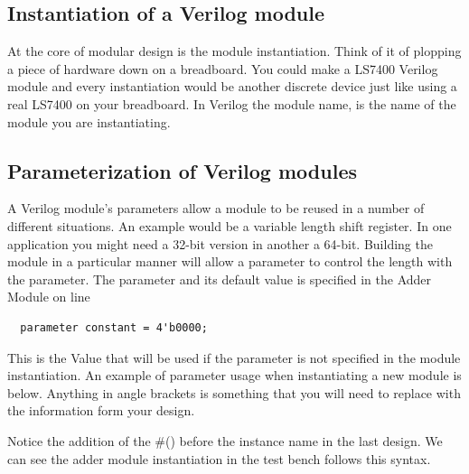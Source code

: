     \subsection{Instantiation of a Verilog module}
      At the core of modular design is the module instantiation. Think of it of plopping a piece of hardware down on a breadboard. You could make a LS7400 Verilog module and every instantiation would be another discrete device just like using a real LS7400 on your breadboard. In Verilog the module name, is the name of the module you are instantiating.
      
    
    \subsection{Parameterization of Verilog modules}
      A Verilog module's parameters allow a module to be reused in a number of different situations. An example would be a variable length shift register. In one application you might need a 32-bit version in another a 64-bit. Building the module in a particular manner will allow a parameter to control the length with the parameter. The parameter and its default value is specified in the Adder Module on line
      \begin{lstlisting}
  parameter constant = 4'b0000;
      \end{lstlisting}
      This is the Value that will be used if the parameter is not specified in the module instantiation. An example of parameter usage when instantiating a new module is below. Anything in angle brackets is something that you will need to replace with the information form your design.
      

      Notice the addition of the \#() before the instance name in the last design. We can see the adder module instantiation in the test bench follows this syntax.
      

